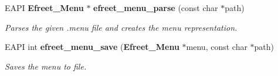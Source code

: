 \begin{CompactItemize}
\item 
EAPI {\bf Efreet\_\-Menu} $\ast$ {\bf efreet\_\-menu\_\-parse} (const char $\ast$path)
\begin{CompactList}\small\item\em Parses the given .menu file and creates the menu representation. \item\end{CompactList}\item 
EAPI int {\bf efreet\_\-menu\_\-save} ({\bf Efreet\_\-Menu} $\ast$menu, const char $\ast$path)
\begin{CompactList}\small\item\em Saves the menu to file. \item\end{CompactList}\end{CompactItemize}
